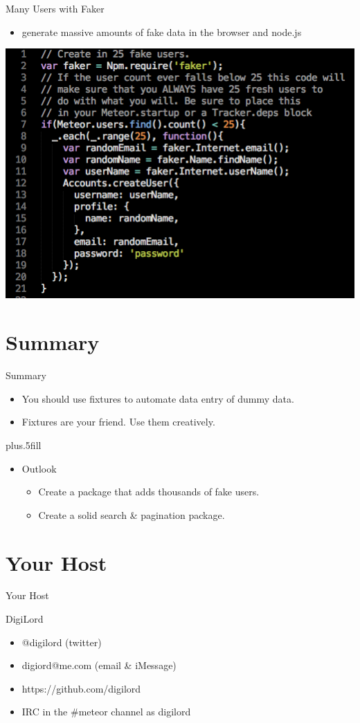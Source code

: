 \documentclass{beamer}
\begin{document}
\begin{frame}{Many Users with Faker}
  \begin{itemize}
    \item generate massive amounts of fake data in the browser and node.js
  \end{itemize}
  \includegraphics[width=0.5\columnwidth]{many-users.png}
\end{frame}


\section*{Summary}

\begin{frame}{Summary}

  \begin{itemize}
  \item
    You should use fixtures to automate data entry of dummy data.
  \item
    Fixtures are your friend. Use them creatively.
  \end{itemize}
  
  \vskip0pt plus.5fill
  \begin{itemize}
  \item
    Outlook
    \begin{itemize}
    \item
      Create a package that adds thousands of fake users.
    \item
      Create a solid search \& pagination package.
    \end{itemize}
  \end{itemize}
\end{frame}

\section*{Your Host}
\begin{frame}{Your Host}
  \begin{block}{DigiLord}
    \begin{itemize}
      \item @digilord (twitter)
      \item digiord@me.com (email \& iMessage)
      \item https://github.com/digilord
      \item IRC in the \#meteor channel as digilord
    \end{itemize}
  \end{block}
\end{frame}
\end{document}
